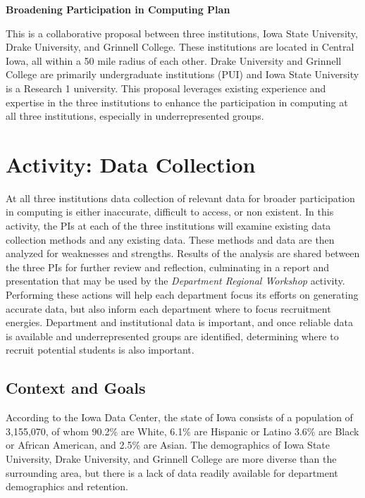 \documentclass[11pt]{article}
\begin{document}
    \setcounter{page}{1}
    \begin{center}
        {\Large {\bf Broadening Participation in Computing Plan}}
    \end{center}

	This is a collaborative proposal between three institutions, Iowa State University, Drake University, and Grinnell College.  These institutions are located in Central Iowa, all within a 50 mile radius of each other.  Drake University and Grinnell College are primarily undergraduate institutions (PUI) and Iowa State University is a Research 1 university.  This proposal leverages existing experience and expertise in the three institutions to enhance the participation in computing at all three institutions, especially in underrepresented groups.

    \section{Activity: Data Collection}
    At all three institutions data collection of relevant data for broader participation in computing is either inaccurate, difficult to access, or non existent.
    In this activity, the PIs at each of the three institutions will examine existing data collection methods and any existing data.
    These methods and data are then analyzed for weaknesses and strengths.  Results of the analysis are shared between the three PIs for further review and reflection, culminating in a report and presentation that may be used by the {\it Department Regional Workshop} activity.
    Performing these actions will help each department focus its efforts on generating accurate data, but also inform each department where to focus recruitment energies.
    Department and institutional data is important, and once reliable data is available and underrepresented groups are identified, determining where to recruit potential students is also important.
    
    \subsection{Context and Goals}
    According to the Iowa Data Center, the state of Iowa consists of a population of 3,155,070, of whom 90.2\% are White, 6.1\% are Hispanic or Latino 3.6\% are Black or African American, and 2.5\% are Asian.
    The demographics of Iowa State University, Drake University, and Grinnell College are more diverse than the surrounding area, but there is a lack of data readily available for department demographics and retention.
\end{document}
